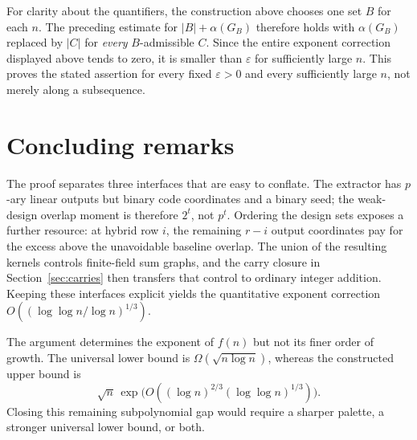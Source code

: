 \documentclass[11pt]{article}
\numberwithin{equation}{section}
\theoremstyle{definition}
\theoremstyle{remark}
\begin{document}
For clarity about the quantifiers, the construction above chooses one
set $B$ for each $n$.  The preceding estimate for
$|B|+\alpha(G_B)$ therefore holds with $\alpha(G_B)$ replaced by
$|C|$ for \emph{every} $B$-admissible $C$.  Since the entire exponent
correction displayed above tends to zero, it is smaller than $\varepsilon$
for sufficiently large $n$.  This proves the stated assertion for every
fixed $\varepsilon>0$ and every sufficiently large $n$, not merely along a
subsequence.

\section{Concluding remarks}

The proof separates three interfaces that are easy to conflate.  The
extractor has $p$-ary linear outputs but binary code coordinates and a
binary seed; the weak-design overlap moment is therefore $2^t$, not $p^t$.
Ordering the design sets exposes a further resource: at hybrid row $i$, the
remaining $r-i$ output coordinates pay for the excess above the unavoidable
baseline overlap.
The union of the resulting kernels controls finite-field sum graphs, and
the carry closure in Section~\ref{sec:carries} then transfers that control
to ordinary integer addition.  Keeping these interfaces explicit yields
the quantitative exponent correction
$O((\log\log n/\log n)^{1/3})$.

The argument determines the exponent of $f(n)$ but not its finer order of
growth.  The universal lower bound is $\Omega(\sqrt{n\log n})$, whereas the
constructed upper bound is
\[
 \sqrt n\,\exp\!\bigl(
 O((\log n)^{2/3}(\log\log n)^{1/3})\bigr).
\]
Closing this remaining subpolynomial gap would require a sharper palette,
a stronger universal lower bound, or both.
\end{document}
